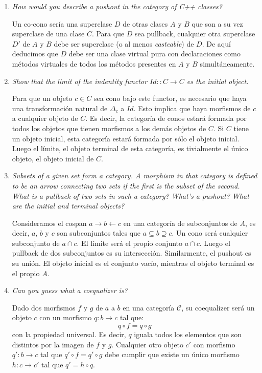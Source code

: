 \documentclass[11pt]{article}
\begin{document}
\begin{enumerate}
\item \textit{How would you describe a pushout in the category of C++ classes?}

Un co-cono sería una superclase $D$ de otras clases $A$ y $B$ que son a su vez superclase de una clase $C$. Para que $D$ sea pullback, cualquier otra superclase $D'$ de $A$ y $B$ debe ser superclase (o al menos \textit{casteable}) de $D$. De aquí deducimos que $D$ debe ser una clase virtual pura con declaraciones como métodos virtuales de todos los métodos presentes en $A$ y $B$ simultáneamente.

\item \textit{Show that the limit of the indentity functor $Id :: C \to C$ es the initial object.}

Para que un objeto $c \in C$ sea cono bajo este functor, es necesario que haya una transformación natural de $Δ_c$ a $Id$. Esto implica que haya morfismos de $c$ a cualquier objeto de $C$. Es decir, la categoría de conos estará formada por todos los objetos que tienen morfismos a los demás objetos de $C$. Si $C$ tiene un objeto inicial, esta categoría estará formada por sólo el objeto inicial. Luego el límite, el objeto terminal de esta categoría, es tivialmente el único objeto, el objeto inicial de $C$.

\item \textit{Subsets of a given set form a category. A morphism in that category is defined to be an arrow connecting two sets if the first is the subset of the second. What is a pullback of two sets in such a category? What's a pushout? What are the initial and terminal objects?}

Consideramos el cospan $a \rightarrow b \leftarrow c$ en una categoría de subconjuntos de $A$, es decir, $a$, $b$ y $c$ son subconjuntos tales que $a \subseteq b \supseteq c$. Un cono será cualquier subconjunto de $a \cap c$. El límite será el propio conjunto $a \cap c$. Luego el pullback de dos subconjuntos es su intersección. Similarmente, el pushout es su unión. El objeto inicial es el conjunto vacío, mientras el objeto terminal es el propio $A$.

\item \textit{Can you guess what a coequalizer is?}

Dado dos morfismos $f$ y $g$ de $a$ a $b$ en una categoría $\mathcal{C}$, su coequalizer será un objeto $c$ con un morfismo $q : b \to c$ tal que:
\[ q \circ f = q \circ g \]
con la propiedad universal. Es decir, $q$ iguala todos los elementos que son distintos por la imagen de $f$ y $g$. Cualquier otro objeto $c'$ con morfismo $q' : b \to c$ tal que $q' \circ f = q' \circ g$ debe cumplir que existe un único morfismo $h : c \to c'$ tal que $q' = h \circ q$.


\end{enumerate}
\end{document}
